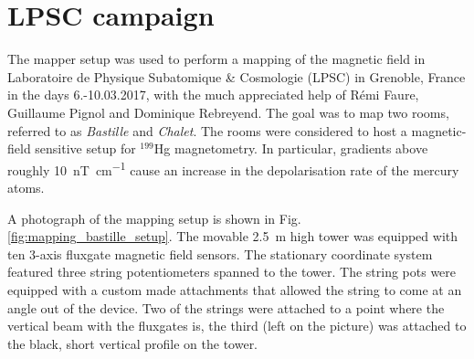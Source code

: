 




\section{LPSC campaign}
The mapper setup was used to perform a mapping of the magnetic field in Laboratoire de Physique Subatomique \& Cosmologie (LPSC) in Grenoble, France in the days 6.-10.03.2017, with the much appreciated help of Rémi Faure, Guillaume Pignol and Dominique Rebreyend. The goal was to map two rooms, referred to as \emph{Bastille} and \emph{Chalet}. The rooms were considered to host a magnetic-field sensitive setup for ${}^{199}$Hg magnetometry. In particular, gradients above roughly \SI[per-mode=symbol]{10}{\nano\tesla\per\centi\meter} cause an increase in the depolarisation rate of the mercury atoms.

A photograph of the mapping setup is shown in Fig.\,\ref{fig:mapping_bastille_setup}. The movable \SI{2.5}{\meter} high tower was equipped with ten 3-axis fluxgate magnetic field sensors. The stationary coordinate system featured three string potentiometers spanned to the tower. The string pots were equipped with a custom made attachments that allowed the string to come at an angle out of the device. Two of the strings were attached to a point where the vertical beam with the fluxgates is, the third (left on the picture) was attached to the black, short vertical profile on the tower.


